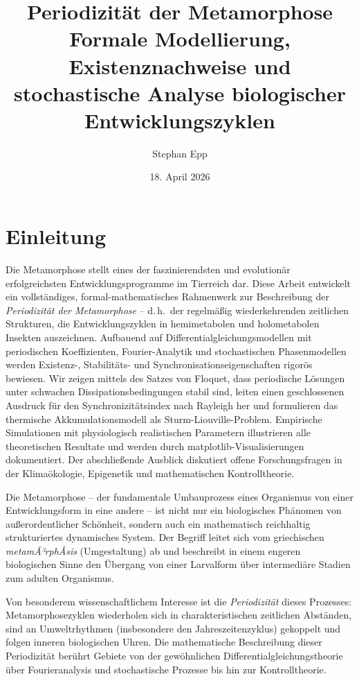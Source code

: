 ﻿\documentclass[12pt, a4paper]{article}
\title{\textbf{Periodizität der Metamorphose}\\[-0.1em] Formale Modellierung, Existenznachweise und
stochastische Analyse biologischer Entwicklungszyklen}
\author{Stephan Epp}
\date{18. April 2026}
\theoremstyle{definition}
\begin{document}
\maketitle
\tableofcontents
\newpage

\section{Einleitung}
Die Metamorphose stellt eines der faszinierendsten und evolutionär erfolgreichsten
Entwicklungsprogramme im Tierreich dar. Diese Arbeit entwickelt ein vollständiges,
formal-mathematisches Rahmenwerk zur Beschreibung der \emph{Periodizität der
Metamorphose} -- d.\,h.\ der regelmäßig wiederkehrenden zeitlichen Strukturen,
die Entwicklungszyklen in hemimetabolen und holometabolen Insekten auszeichnen.
Aufbauend auf Differentialgleichungsmodellen mit periodischen Koeffizienten,
Fourier-Analytik und stochastischen Phasenmodellen werden Existenz-, Stabilitäts-
und Synchronisationseigenschaften rigorös bewiesen. Wir zeigen mittels des
Satzes von Floquet, dass periodische Lösungen unter schwachen Dissipationsbedingungen
stabil sind, leiten einen geschlossenen Ausdruck für den Synchronizitätsindex
nach Rayleigh her und formulieren das thermische Akkumulationsmodell als
Sturm-Liouville-Problem. Empirische Simulationen mit physiologisch realistischen
Parametern illustrieren alle theoretischen Resultate und werden durch
matplotlib-Visualisierungen dokumentiert. Der abschließende Ausblick diskutiert
offene Forschungsfragen in der Klimaökologie, Epigenetik und mathematischen
Kontrolltheorie.

Die Metamorphose -- der fundamentale Umbauprozess eines Organismus von einer
Entwicklungsform in eine andere -- ist nicht nur ein biologisches Phänomen von
außerordentlicher Schönheit, sondern auch ein mathematisch reichhaltig strukturiertes
dynamisches System. Der Begriff leitet sich vom griechischen \emph{metamÃ³rphÅsis}
(Umgestaltung) ab und beschreibt in einem engeren biologischen Sinne den Übergang
von einer Larvalform über intermediäre Stadien zum adulten Organismus.

Von besonderem wissenschaftlichem Interesse ist die \emph{Periodizität} dieses
Prozesses: Metamorphosezyklen wiederholen sich in charakteristischen zeitlichen
Abständen, sind an Umweltrhythmen (insbesondere den Jahreszeitenzyklus) gekoppelt
und folgen inneren biologischen Uhren. Die mathematische Beschreibung dieser
Periodizität berührt Gebiete von der gewöhnlichen Differentialgleichungstheorie
über Fourieranalysis und stochastische Prozesse bis hin zur Kontrolltheorie.
\end{document}
